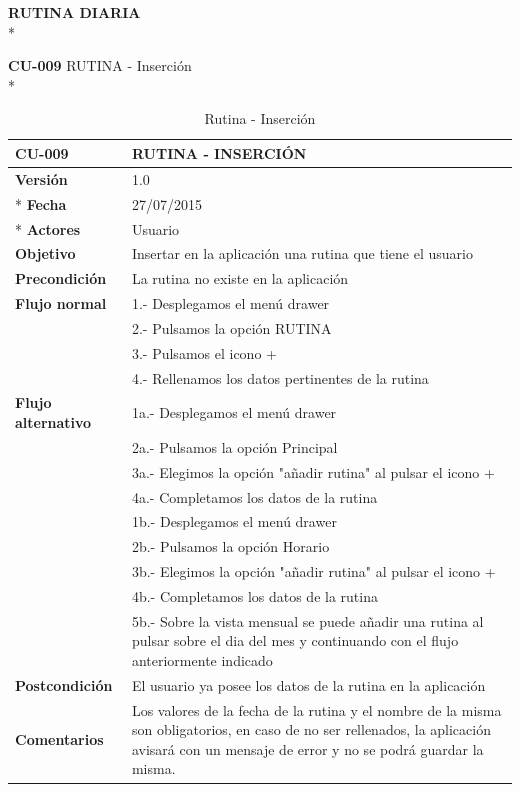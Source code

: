 \documentclass[../pfc.tex]{subfiles}
\begin{document}
	
	\textbf{RUTINA DIARIA}\\*
		
	\textbf{CU-009}	RUTINA - Inserción\\*
		
		\begin{table}[H]
			\centering
			\begin{tabular}[t]{|p{3cm}|p{9.5cm}|}
				\hline \textbf{CU-009} & \textbf{RUTINA - INSERCIÓN} \\*
				\hline\hline \textbf{Versión} & 1.0 \\ *
				\hline\hline \textbf{Fecha} & 27/07/2015 \\ *
				\hline\textbf{Actores} 	& Usuario\\*
				\hline \textbf{Objetivo} & Insertar en la aplicación una rutina que tiene el usuario\\* 			
				\hline \textbf{Precondición} & La rutina no existe en la aplicación\\* 
				\hline \textbf{Flujo normal} & 1.- Desplegamos el menú drawer \\* 
				& 2.- Pulsamos la opción RUTINA\\*	
				& 3.- Pulsamos el icono +\\*	
				& 4.- Rellenamos los datos pertinentes de la rutina\\*	
				\hline \textbf{Flujo alternativo} & 1a.- Desplegamos el menú drawer \\* 
				& 2a.- Pulsamos la opción Principal \\*	
				& 3a.- Elegimos la opción "añadir rutina" al pulsar el icono +\\*	
				& 4a.- Completamos los datos de la rutina\\*	
				& 1b.- Desplegamos el menú drawer \\* 
				& 2b.- Pulsamos la opción Horario \\*	
				& 3b.- Elegimos la opción "añadir rutina" al pulsar el icono +\\*	
				& 4b.- Completamos los datos de la rutina\\*	
				& 5b.- Sobre la vista mensual se puede añadir una rutina al pulsar sobre el dia del mes y continuando con el flujo anteriormente indicado\\*	
				\hline \textbf{Postcondición} & El usuario ya posee los datos de la rutina en la aplicación \\* 
				\hline \textbf{Comentarios}   & Los valores de la fecha de la rutina y el nombre de la misma son obligatorios, en caso de no ser rellenados, la aplicación avisará con un mensaje de error y no se podrá guardar la misma.\\*
				\hline
			\end{tabular}
			\caption{Rutina - Inserción}
			\label{tabla:caso009}
		\end{table}
		
\end{document}
